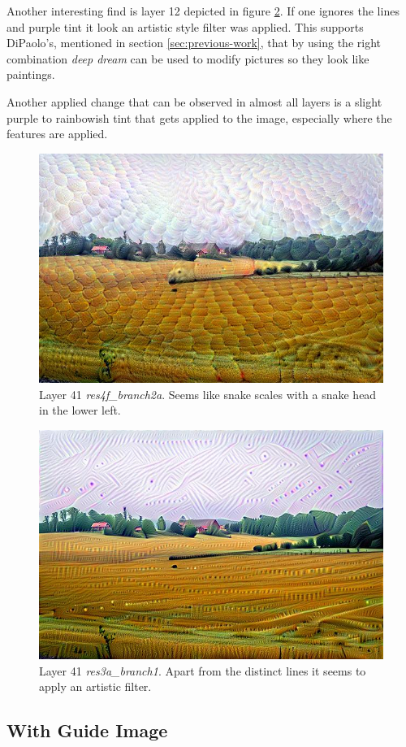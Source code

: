 Another interesting find is layer 12 depicted in figure \ref{fig:layer-artistic}. If one ignores the lines and purple tint it look an artistic style filter was applied. This supports DiPaolo's, mentioned in section \ref{sec:previous-work}, that by using the right combination \textit{deep dream} can be used to modify pictures so they look like paintings.

Another applied change that can be observed in almost all layers is a slight purple to rainbowish tint that gets applied to the image, especially where the features are applied.

\begin{figure}[H]
	\centering
	\includegraphics[width=0.5\linewidth]{img/alpsted-landscape_res4f_branch2a.jpg}
	\caption{Layer 41 \emph{res4f\_branch2a}. Seems like snake scales with a snake head in the lower left.}
	\label{fig:layer-snake}
\end{figure}
\begin{figure}[H]
\centering
\includegraphics[width=0.5\linewidth]{img/alpsted-landscape_res3a_branch1.jpg}
\caption{Layer 41 \emph{res3a\_branch1}. Apart from the distinct lines it seems to apply an artistic filter.}
\label{fig:layer-artistic}
\end{figure}


\subsection{With Guide Image}
\label{sec:withguide}
